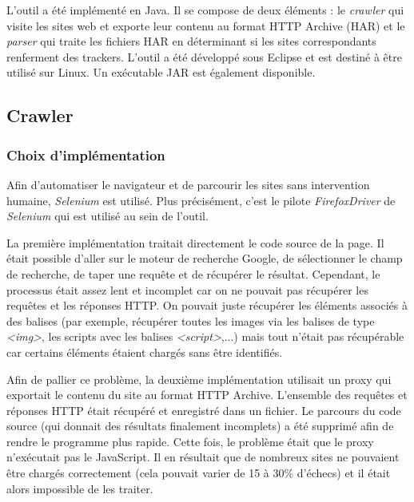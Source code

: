 L'outil a été implémenté en Java. Il se compose de deux éléments : le \textit{crawler} qui visite les sites web et exporte leur contenu au format HTTP Archive (HAR) et le \textit{parser} qui traite les fichiers HAR en déterminant si les sites correspondants renferment des trackers.
L'outil a été développé sous Eclipse et est destiné à être utilisé sur Linux. Un exécutable JAR est également disponible.
\newline

\subsection{Crawler}
\label{crawler}
\subsubsection{Choix d'implémentation}
Afin d'automatiser le navigateur et de parcourir les sites sans intervention humaine, \textit{Selenium} \cite{selenium_homepage} est utilisé. Plus précisément, c'est le pilote \textit{FirefoxDriver} de \textit{Selenium} qui est utilisé au sein de l'outil.

La première implémentation traitait directement le code source de la page. Il était possible d'aller sur le moteur de recherche Google, de sélectionner le champ de recherche, de taper une requête et de récupérer le résultat. Cependant, le processus était assez lent et incomplet car on ne pouvait pas récupérer les requêtes et les réponses HTTP. On pouvait juste récupérer les éléments associés à des balises (par exemple, récupérer toutes les images via les balises de type \textit{<img>}, les scripts avec les balises \textit{<script>},...) mais tout n'était pas récupérable car certains éléments étaient chargés sans être identifiés.

Afin de pallier ce problème, la deuxième implémentation utilisait un proxy qui exportait le contenu du site au format HTTP Archive. L'ensemble des requêtes et réponses HTTP était récupéré et enregistré dans un fichier. Le parcours du code source (qui donnait des résultats finalement incomplets) a été supprimé afin de rendre le programme plus rapide. Cette fois, le problème était que le proxy n'exécutait pas le JavaScript. Il en résultait que de nombreux sites ne pouvaient être chargés correctement (cela pouvait varier de 15 à 30\% d'échecs) et il était alors impossible de les traiter.

